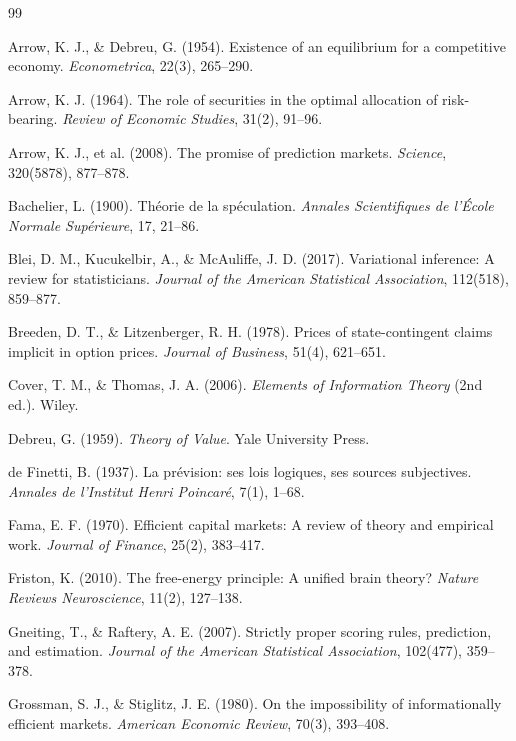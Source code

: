 \documentclass[12pt,a4paper]{article}
\theoremstyle{definition}
\begin{document}
\begin{thebibliography}{99}

Arrow, K. J., \& Debreu, G. (1954). Existence of an equilibrium for a competitive economy. \textit{Econometrica}, 22(3), 265--290.

Arrow, K. J. (1964). The role of securities in the optimal allocation of risk-bearing. \textit{Review of Economic Studies}, 31(2), 91--96.

Arrow, K. J., et al. (2008). The promise of prediction markets. \textit{Science}, 320(5878), 877--878.

Bachelier, L. (1900). Th\'{e}orie de la sp\'{e}culation. \textit{Annales Scientifiques de l'\'{E}cole Normale Sup\'{e}rieure}, 17, 21--86.

Blei, D. M., Kucukelbir, A., \& McAuliffe, J. D. (2017). Variational inference: A review for statisticians. \textit{Journal of the American Statistical Association}, 112(518), 859--877.

Breeden, D. T., \& Litzenberger, R. H. (1978). Prices of state-contingent claims implicit in option prices. \textit{Journal of Business}, 51(4), 621--651.

Cover, T. M., \& Thomas, J. A. (2006). \textit{Elements of Information Theory} (2nd ed.). Wiley.

Debreu, G. (1959). \textit{Theory of Value}. Yale University Press.

de Finetti, B. (1937). La pr\'{e}vision: ses lois logiques, ses sources subjectives. \textit{Annales de l'Institut Henri Poincar\'{e}}, 7(1), 1--68.

Fama, E. F. (1970). Efficient capital markets: A review of theory and empirical work. \textit{Journal of Finance}, 25(2), 383--417.

Friston, K. (2010). The free-energy principle: A unified brain theory? \textit{Nature Reviews Neuroscience}, 11(2), 127--138.

Gneiting, T., \& Raftery, A. E. (2007). Strictly proper scoring rules, prediction, and estimation. \textit{Journal of the American Statistical Association}, 102(477), 359--378.

Grossman, S. J., \& Stiglitz, J. E. (1980). On the impossibility of informationally efficient markets. \textit{American Economic Review}, 70(3), 393--408.


\end{thebibliography}
\end{document}
